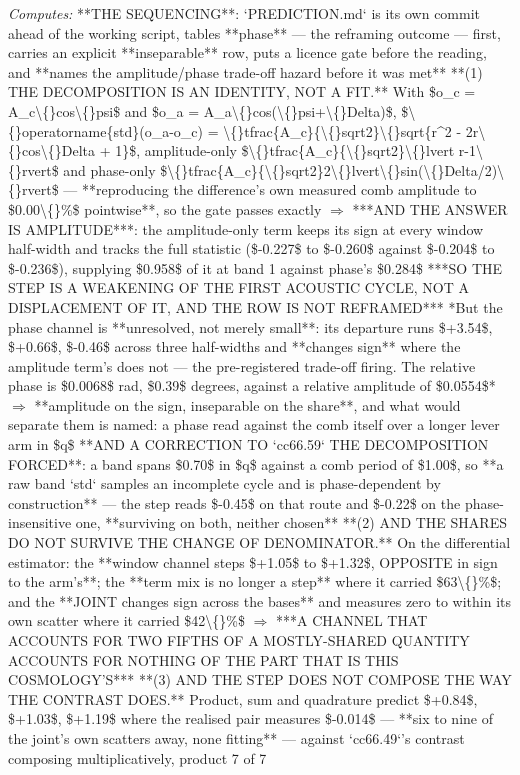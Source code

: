 \begin{description}
\emph{Computes:}  **THE SEQUENCING**: `PREDICTION.md` is its own commit ahead of the working script, tables **phase** --- the reframing outcome --- first, carries an explicit **inseparable** row, puts a licence gate before the reading, and **names the amplitude/phase trade-off hazard before it was met**   **(1) THE DECOMPOSITION IS AN IDENTITY, NOT A FIT.** With \$o\_c = A\_c\textbackslash\{\}cos\textbackslash\{\}psi\$ and \$o\_a = A\_a\textbackslash\{\}cos(\textbackslash\{\}psi+\textbackslash\{\}Delta)\$, \$\textbackslash\{\}operatorname\{std\}(o\_a-o\_c) = \textbackslash\{\}tfrac\{A\_c\}\{\textbackslash\{\}sqrt2\}\textbackslash\{\}sqrt\{r\textasciicircum{}2 - 2r\textbackslash\{\}cos\textbackslash\{\}Delta + 1\}\$, amplitude-only \$\textbackslash\{\}tfrac\{A\_c\}\{\textbackslash\{\}sqrt2\}\textbackslash\{\}lvert r-1\textbackslash\{\}rvert\$ and phase-only \$\textbackslash\{\}tfrac\{A\_c\}\{\textbackslash\{\}sqrt2\}2\textbackslash\{\}lvert\textbackslash\{\}sin(\textbackslash\{\}Delta/2)\textbackslash\{\}rvert\$ --- **reproducing the difference's own measured comb amplitude to \$0.00\textbackslash\{\}\%\$ pointwise**, so the gate passes exactly  \ensuremath{\Rightarrow} ***AND THE ANSWER IS AMPLITUDE***: the amplitude-only term keeps its sign at every window half-width and tracks the full statistic (\$-0.227\$ to \$-0.260\$ against \$-0.204\$ to \$-0.236\$), supplying \$0.958\$ of it at band 1 against phase's \$0.284\$  ***SO THE STEP IS A WEAKENING OF THE FIRST ACOUSTIC CYCLE, NOT A DISPLACEMENT OF IT, AND THE ROW IS NOT REFRAMED***   *But the phase channel is **unresolved, not merely small**: its departure runs \$+3.54\$, \$+0.66\$, \$-0.46\$ across three half-widths and **changes sign** where the amplitude term's does not --- the pre-registered trade-off firing.  The relative phase is \$0.0068\$ rad, \$0.39\$ degrees, against a relative amplitude of \$0.0554\$* \ensuremath{\Rightarrow} **amplitude on the sign, inseparable on the share**, and what would separate them is named: a phase read against the comb itself over a longer lever arm in \$q\$   **AND A CORRECTION TO `cc66.59` THE DECOMPOSITION FORCED**: a band spans \$0.70\$ in \$q\$ against a comb period of \$1.00\$, so **a raw band `std` samples an incomplete cycle and is phase-dependent by construction** --- the step reads \$-0.45\$ on that route and \$-0.22\$ on the phase-insensitive one, **surviving on both, neither chosen**   **(2) AND THE SHARES DO NOT SURVIVE THE CHANGE OF DENOMINATOR.** On the differential estimator: the **window channel steps \$+1.05\$ to \$+1.32\$, OPPOSITE in sign to the arm's**; the **term mix is no longer a step** where it carried \$63\textbackslash\{\}\%\$; and the **JOINT changes sign across the bases** and measures zero to within its own scatter where it carried \$42\textbackslash\{\}\%\$  \ensuremath{\Rightarrow} ***A CHANNEL THAT ACCOUNTS FOR TWO FIFTHS OF A MOSTLY-SHARED QUANTITY ACCOUNTS FOR NOTHING OF THE PART THAT IS THIS COSMOLOGY'S***   **(3) AND THE STEP DOES NOT COMPOSE THE WAY THE CONTRAST DOES.** Product, sum and quadrature predict \$+0.84\$, \$+1.03\$, \$+1.19\$ where the realised pair measures \$-0.014\$ --- **six to nine of the joint's own scatters away, none fitting** --- against `cc66.49`'s contrast composing multiplicatively, product 7 of 7 
\end{description}
